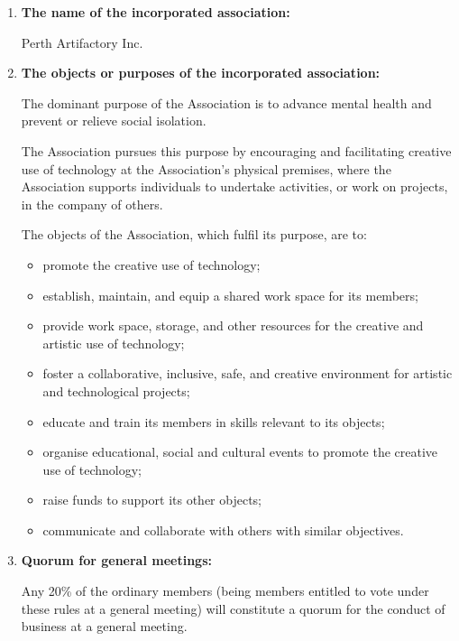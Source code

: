 \documentclass[../constitution.tex]{subfiles}
\begin{document}
 \label{key-information}

\begin{enumerate}[label=\Alph*.]
  \item \textbf{The name of the incorporated association:} \label{key-info-name-of-association}

        Perth Artifactory Inc.

  \item \textbf{The objects or purposes of the incorporated association:} \label{key-info-objects-purposes}




        The dominant purpose of the Association is to advance mental health and prevent or relieve social isolation.

        The Association pursues this purpose by encouraging and facilitating creative use of technology at the Association's physical premises, where the Association supports individuals to undertake activities, or work on projects, in the company of others.

        The objects of the Association, which fulfil its purpose, are to:


        \begin{itemize}
          \item promote the creative use of technology;
          \item establish, maintain, and equip a shared work space for its members;
          \item provide work space, storage, and other resources for the creative and artistic use of technology;
          \item foster a collaborative, inclusive, safe, and creative environment for artistic and technological projects;
          \item educate and train its members in skills relevant to its objects;
          \item organise educational, social and cultural events to promote the creative use of technology;
          \item raise funds to support its other objects;
          \item communicate and collaborate with others with similar objectives.
        \end{itemize}

  \item \textbf{Quorum for general meetings:} \label{key-info-quorum-for-general-meetings}

        Any 20\% of the ordinary members (being members entitled to vote under these rules at a general meeting) will constitute a quorum for the conduct of business at a general meeting.


\end{enumerate}
\end{document}
